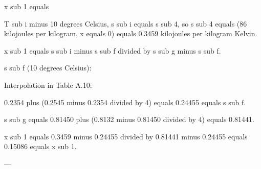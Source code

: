 x sub 1 equals  

T sub i minus 10 degrees Celsius, s sub i equals s sub 4, so s sub 4 equals (86 kilojoules per kilogram, x equals 0) equals 0.3459 kilojoules per kilogram Kelvin.  

x sub 1 equals s sub i minus s sub f divided by s sub g minus s sub f.  

s sub f (10 degrees Celsius):  

Interpolation in Table A.10:  

0.2354 plus (0.2545 minus 0.2354 divided by 4) equals 0.24455 equals s sub f.  

s sub g equals 0.81450 plus (0.8132 minus 0.81450 divided by 4) equals 0.81441.  

x sub 1 equals 0.3459 minus 0.24455 divided by 0.81441 minus 0.24455 equals 0.15086 equals x sub 1.  

---